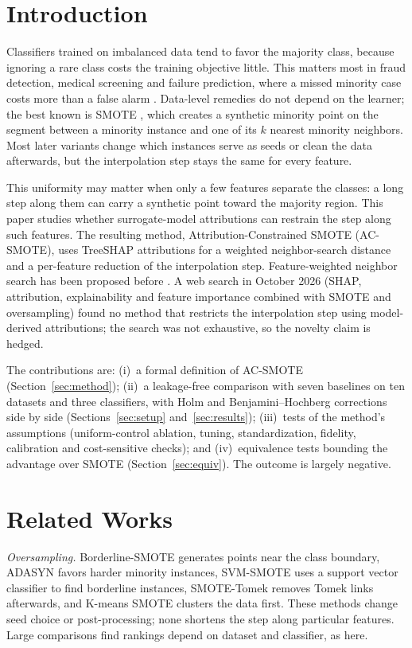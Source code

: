 \documentclass[conference,a4paper]{IEEEtran}
\newcommand{\acs}{AC-SMOTE}
\begin{document}
\section{Introduction}
Classifiers trained on imbalanced data tend to favor the majority class, because ignoring a rare class costs the training objective little. This matters most in fraud detection, medical screening and failure prediction, where a missed minority case costs more than a false alarm \cite{he2009learning}. Data-level remedies do not depend on the learner; the best known is SMOTE \cite{chawla2002smote}, which creates a synthetic minority point on the segment between a minority instance and one of its $k$ nearest minority neighbors. Most later variants \cite{fernandez2018smote} change which instances serve as seeds or clean the data afterwards, but the interpolation step stays the same for every feature.

This uniformity may matter when only a few features separate the classes: a long step along them can carry a synthetic point toward the majority region. This paper studies whether surrogate-model attributions can restrain the step along such features. The resulting method, Attribution-Constrained SMOTE (\acs{}), uses TreeSHAP attributions \cite{lundberg2017unified,lundberg2020local} for a weighted neighbor-search distance and a per-feature reduction of the interpolation step. Feature-weighted neighbor search has been proposed before \cite{maldonado2022fw}. A web search in October 2026 (SHAP, attribution, explainability and feature importance combined with SMOTE and oversampling) found no method that restricts the interpolation step using model-derived attributions; the search was not exhaustive, so the novelty claim is hedged.

The contributions are: (i)~a formal definition of \acs{} (Section~\ref{sec:method}); (ii)~a leakage-free comparison with seven baselines on ten datasets and three classifiers, with Holm and Benjamini--Hochberg corrections side by side (Sections~\ref{sec:setup} and~\ref{sec:results}); (iii)~tests of the method's assumptions (uniform-control ablation, tuning, standardization, fidelity, calibration and cost-sensitive checks); and (iv)~equivalence tests bounding the advantage over SMOTE (Section~\ref{sec:equiv}). The outcome is largely negative.

\section{Related Works}
\textit{Oversampling.} Borderline-SMOTE \cite{han2005borderline} generates points near the class boundary, ADASYN \cite{he2008adasyn} favors harder minority instances, SVM-SMOTE \cite{nguyen2011svm} uses a support vector classifier to find borderline instances, SMOTE-Tomek \cite{batista2004study} removes Tomek links afterwards, and K-means SMOTE \cite{douzas2018kmeans} clusters the data first. These methods change seed choice or post-processing; none shortens the step along particular features. Large comparisons \cite{kovacs2019empirical} find rankings depend on dataset and classifier, as here.
\end{document}
